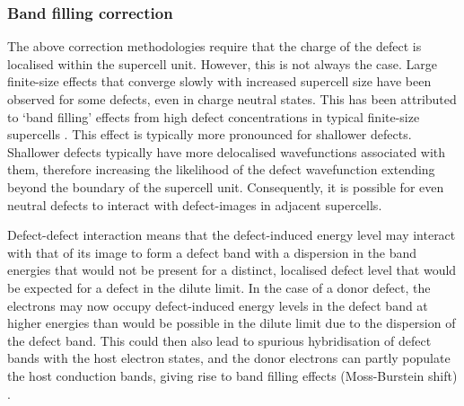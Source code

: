\documentclass[11pt, twoside]{report}
\begin{document}
\subsubsection{Band filling correction}


The above correction methodologies require that the charge of the defect is localised within the supercell unit. However, this is not always the case. Large finite-size effects that converge slowly with increased supercell size have been observed for some defects, even in charge neutral states. This has been attributed to ‘band filling’ effects from high defect concentrations in typical finite-size supercells \cite{Lany_defects_2008, CIS_defects, pylada}. This effect is typically more pronounced for shallower defects. Shallower defects typically have more delocalised wavefunctions associated with them, therefore increasing the likelihood of the defect wavefunction extending beyond the boundary of the supercell unit. Consequently, it is possible for even neutral defects to interact with defect-images in adjacent supercells. 

Defect-defect interaction means that the defect-induced energy level may interact with that of its image to form a defect band with a dispersion in the band energies that would not be present for a distinct, localised defect level that would be expected for a defect in the dilute limit. In the case of a donor defect, the electrons may now occupy defect-induced energy levels in the defect band at higher energies than would be possible in the dilute limit due to the dispersion of the defect band. This could then also lead to spurious hybridisation of defect bands with the host electron states, and the donor electrons can partly populate the host conduction bands, giving rise to band filling effects (Moss-Burstein shift) \cite{Lany_defects_2008}.
\end{document}
